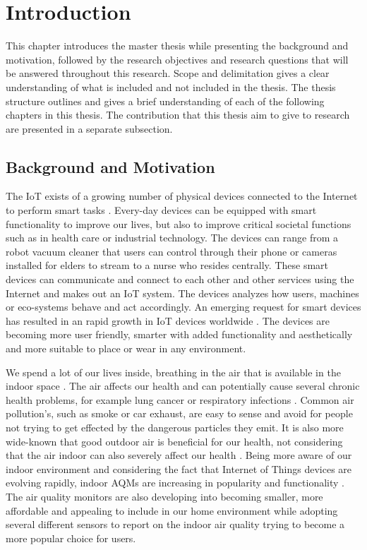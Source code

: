 \chapter{Introduction}
This chapter introduces the master thesis while presenting the background and motivation, followed by the research objectives and research questions that will be answered throughout this research. Scope and delimitation gives a clear understanding of what is included and not included in the thesis. The thesis structure outlines and gives a brief understanding of each of the following chapters in this thesis. The contribution that this thesis aim to give to research are presented in a separate subsection. 

\section{Background and Motivation}
The \gls{IoT} exists of a growing number of physical devices connected to the Internet to perform smart tasks \cite{IoTSurveyAl-Fuqaha}. Every-day devices can be equipped with smart functionality to improve our lives, but also to improve critical societal functions such as in health care or industrial technology. The devices can range from a robot vacuum cleaner that users can control through their phone or cameras installed for elders to stream to a nurse who resides centrally. These smart devices can communicate and connect to each other and other services using the Internet and makes out an \gls{IoT} system. The devices analyzes how users, machines or eco-systems behave and act accordingly. An emerging request for smart devices has resulted in an rapid growth in \gls{IoT} devices worldwide \cite{IoTAndPrivacy}. The devices are becoming more user friendly, smarter with added functionality and aesthetically and more suitable to place or wear in any environment. 

We spend a lot of our lives inside, breathing in the air that is available in the indoor space \cite{IndoorAirQualityMonitorIoT}. The air affects our health and can potentially cause several chronic health problems, for example lung cancer or respiratory infections \cite{IAQMonitorReview}. Common air pollution's, such as smoke or car exhaust, are easy to sense and avoid for people not trying to get effected by the dangerous particles they emit. It is also more wide-known that good outdoor air is beneficial for our health, not considering that the air indoor can also severely affect our health \cite{IndoorAirQuality}. Being more aware of our indoor environment and considering the fact that Internet of Things devices are evolving rapidly, indoor \gls{AQM}s are increasing in popularity and functionality \cite{SecurityAndDataIntInAQM}. The air quality monitors are also developing into becoming smaller, more affordable and appealing to include in our home environment while adopting several different sensors to report on the indoor air quality trying to become a more popular choice for users. 

